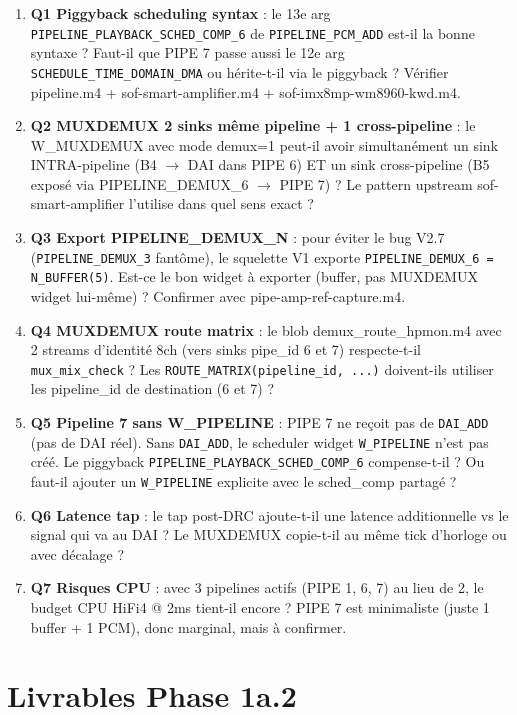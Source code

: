 \documentclass[11pt,a4paper]{article}
\begin{document}
\begin{enumerate}[leftmargin=*, itemsep=2pt]
  \item \textbf{Q1 Piggyback scheduling syntax} : le 13e arg \texttt{PIPELINE\_PLAYBACK\_SCHED\_COMP\_6} de \texttt{PIPELINE\_PCM\_ADD} est-il la bonne syntaxe ? Faut-il que PIPE 7 passe aussi le 12e arg \texttt{SCHEDULE\_TIME\_DOMAIN\_DMA} ou hérite-t-il via le piggyback ? Vérifier pipeline.m4 + sof-smart-amplifier.m4 + sof-imx8mp-wm8960-kwd.m4.
  \item \textbf{Q2 MUXDEMUX 2 sinks même pipeline + 1 cross-pipeline} : le W\_MUXDEMUX avec mode demux=1 peut-il avoir simultanément un sink INTRA-pipeline (B4 $\to$ DAI dans PIPE 6) ET un sink cross-pipeline (B5 exposé via PIPELINE\_DEMUX\_6 $\to$ PIPE 7) ? Le pattern upstream sof-smart-amplifier l'utilise dans quel sens exact ?
  \item \textbf{Q3 Export PIPELINE\_DEMUX\_N} : pour éviter le bug V2.7 (\texttt{PIPELINE\_DEMUX\_3} fantôme), le squelette V1 exporte \texttt{PIPELINE\_DEMUX\_6 = N\_BUFFER(5)}. Est-ce le bon widget à exporter (buffer, pas MUXDEMUX widget lui-même) ? Confirmer avec pipe-amp-ref-capture.m4.
  \item \textbf{Q4 MUXDEMUX route matrix} : le blob demux\_route\_hpmon.m4 avec 2 streams d'identité 8ch (vers sinks pipe\_id 6 et 7) respecte-t-il \texttt{mux\_mix\_check} ? Les \texttt{ROUTE\_MATRIX(pipeline\_id, ...)} doivent-ils utiliser les pipeline\_id de destination (6 et 7) ?
  \item \textbf{Q5 Pipeline 7 sans W\_PIPELINE} : PIPE 7 ne reçoit pas de \texttt{DAI\_ADD} (pas de DAI réel). Sans \texttt{DAI\_ADD}, le scheduler widget \texttt{W\_PIPELINE} n'est pas créé. Le piggyback \texttt{PIPELINE\_PLAYBACK\_SCHED\_COMP\_6} compense-t-il ? Ou faut-il ajouter un \texttt{W\_PIPELINE} explicite avec le sched\_comp partagé ?
  \item \textbf{Q6 Latence tap} : le tap post-DRC ajoute-t-il une latence additionnelle vs le signal qui va au DAI ? Le MUXDEMUX copie-t-il au même tick d'horloge ou avec décalage ?
  \item \textbf{Q7 Risques CPU} : avec 3 pipelines actifs (PIPE 1, 6, 7) au lieu de 2, le budget CPU HiFi4 @ 2ms tient-il encore ? PIPE 7 est minimaliste (juste 1 buffer + 1 PCM), donc marginal, mais à confirmer.
\end{enumerate}

\section{Livrables Phase 1a.2}
\end{document}
